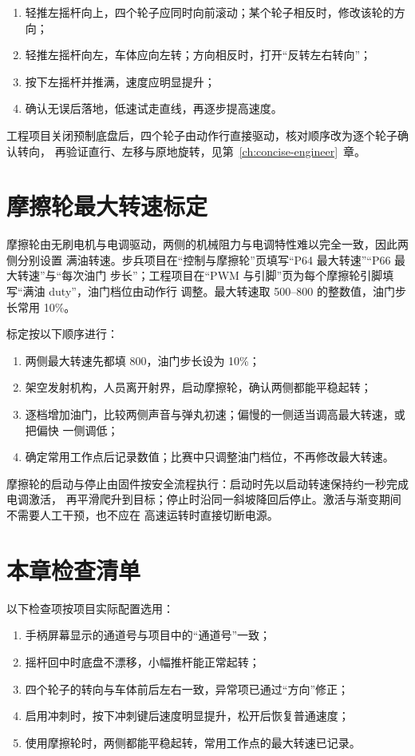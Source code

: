 \begin{enumerate}
  \item 轻推左摇杆向上，四个轮子应同时向前滚动；某个轮子相反时，修改该轮的方向；
  \item 轻推左摇杆向左，车体应向左转；方向相反时，打开“反转左右转向”；
  \item 按下左摇杆并推满，速度应明显提升；
  \item 确认无误后落地，低速试走直线，再逐步提高速度。
\end{enumerate}

工程项目关闭预制底盘后，四个轮子由动作行直接驱动，核对顺序改为逐个轮子确认转向，
再验证直行、左移与原地旋转，见第~\ref{ch:concise-engineer}~章。

\section{摩擦轮最大转速标定}
\label{sec:concise-friction-calibrate}

摩擦轮由无刷电机与电调驱动，两侧的机械阻力与电调特性难以完全一致，因此两侧分别设置
满油转速。步兵项目在“控制与摩擦轮”页填写“P64 最大转速”“P66 最大转速”与“每次油门
步长”；工程项目在“PWM 与引脚”页为每个摩擦轮引脚填写“满油 duty”，油门档位由动作行
调整。最大转速取 500--800 的整数值，油门步长常用 10\%。

标定按以下顺序进行：

\begin{enumerate}
  \item 两侧最大转速先都填 800，油门步长设为 10\%；
  \item 架空发射机构，人员离开射界，启动摩擦轮，确认两侧都能平稳起转；
  \item 逐档增加油门，比较两侧声音与弹丸初速；偏慢的一侧适当调高最大转速，或把偏快
        一侧调低；
  \item 确定常用工作点后记录数值；比赛中只调整油门档位，不再修改最大转速。
\end{enumerate}

摩擦轮的启动与停止由固件按安全流程执行：启动时先以启动转速保持约一秒完成电调激活，
再平滑爬升到目标；停止时沿同一斜坡降回后停止。激活与渐变期间不需要人工干预，也不应在
高速运转时直接切断电源。

\section{本章检查清单}

以下检查项按项目实际配置选用：

\begin{enumerate}
  \item 手柄屏幕显示的通道号与项目中的“通道号”一致；
  \item 摇杆回中时底盘不漂移，小幅推杆能正常起转；
  \item 四个轮子的转向与车体前后左右一致，异常项已通过“方向”修正；
  \item 启用冲刺时，按下冲刺键后速度明显提升，松开后恢复普通速度；
  \item 使用摩擦轮时，两侧都能平稳起转，常用工作点的最大转速已记录。
\end{enumerate}
